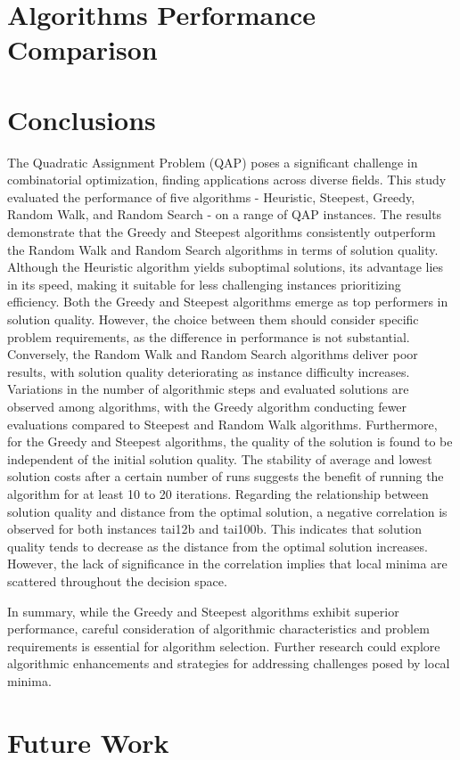 \documentclass{article}
\begin{document}
\section{Algorithms Performance Comparison}\label{sec:algorithms-performance-comparison}


\section{Conclusions}\label{sec:conclusions}
The Quadratic Assignment Problem (QAP) poses a significant challenge in combinatorial optimization, finding applications across diverse fields.
This study evaluated the performance of five algorithms - Heuristic, Steepest, Greedy, Random Walk, and Random Search - on a range of QAP instances.
The results demonstrate that the Greedy and Steepest algorithms consistently outperform the Random Walk and Random Search algorithms in terms of solution quality.
Although the Heuristic algorithm yields suboptimal solutions,
its advantage lies in its speed, making it suitable for less challenging instances prioritizing efficiency.
Both the Greedy and Steepest algorithms emerge as top performers in solution quality.
However, the choice between them should consider specific problem requirements, as the difference in performance is not substantial.
Conversely, the Random Walk and Random Search algorithms deliver poor results, with solution quality deteriorating as instance difficulty increases.
Variations in the number of algorithmic steps and evaluated solutions are observed among algorithms,
with the Greedy algorithm conducting fewer evaluations compared to Steepest and Random Walk algorithms.
Furthermore, for the Greedy and Steepest algorithms, the quality of the solution is found to be independent of the initial solution quality.
The stability of average and lowest solution costs after a certain number of runs suggests the benefit of running the algorithm for at least 10 to 20 iterations.
Regarding the relationship between solution quality and distance from the optimal solution,
a negative correlation is observed for both instances tai12b and tai100b.
This indicates that solution quality tends to decrease as the distance from the optimal solution increases.
However, the lack of significance in the correlation implies that local minima are scattered throughout the decision space.

In summary, while the Greedy and Steepest algorithms exhibit superior performance,
careful consideration of algorithmic characteristics and problem requirements is essential for algorithm selection.
Further research could explore algorithmic enhancements and strategies for addressing challenges posed by local minima.

\section{Future Work}\label{sec:future-work}

\end{document}

